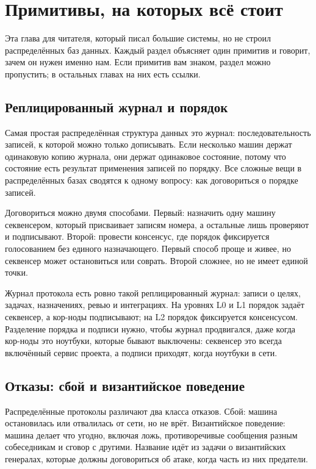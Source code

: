 \chapter{Примитивы, на которых всё стоит}

Эта глава для читателя, который писал большие системы, но не строил распределённых баз данных. Каждый раздел объясняет один примитив и говорит, зачем он нужен именно нам. Если примитив вам знаком, раздел можно пропустить; в остальных главах на них есть ссылки.

\section{Реплицированный журнал и порядок}

Самая простая распределённая структура данных это журнал: последовательность записей, к которой можно только дописывать. Если несколько машин держат одинаковую копию журнала, они держат одинаковое состояние, потому что состояние есть результат применения записей по порядку. Все сложные вещи в распределённых базах сводятся к одному вопросу: как договориться о порядке записей.

Договориться можно двумя способами. Первый: назначить одну машину секвенсером, который присваивает записям номера, а остальные лишь проверяют и подписывают. Второй: провести консенсус, где порядок фиксируется голосованием без единого назначающего. Первый способ проще и живее, но секвенсер может остановиться или соврать. Второй сложнее, но не имеет единой точки.

\begin{likbez}
Журнал протокола есть ровно такой реплицированный журнал: записи о целях, задачах, назначениях, ревью и интеграциях. На уровнях L0 и L1 порядок задаёт секвенсер, а кор-ноды подписывают; на L2 порядок фиксируется консенсусом. Разделение порядка и подписи нужно, чтобы журнал продвигался, даже когда кор-ноды это ноутбуки, которые бывают выключены: секвенсер это всегда включённый сервис проекта, а подписи приходят, когда ноутбуки в сети.
\end{likbez}

\section{Отказы: сбой и византийское поведение}

Распределённые протоколы различают два класса отказов. Сбой: машина остановилась или отвалилась от сети, но не врёт. Византийское поведение: машина делает что угодно, включая ложь, противоречивые сообщения разным собеседникам и сговор с другими. Название идёт из задачи о византийских генералах, которые должны договориться об атаке, когда часть из них предатели.

